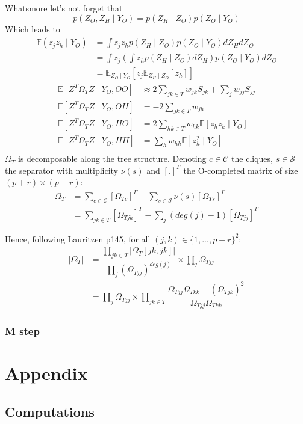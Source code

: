 \documentclass[11pt,a4paper]{article}
\newcommand{\Esp}{\mathds{E}}
\begin{document}
 Whatsmore let's not forget that
 $$ p(Z_O,Z_H \mid Y_O) = p(Z_H\mid Z_O) p(Z_O\mid Y_O)$$
 Which leads to 
 \begin{align*}
 \Esp(z_jz_h \mid Y_O)& = \int z_jz_hp(Z_H\mid Z_O)p(Z_O\mid Y_O) dZ_HdZ_O\\
 &=\int z_j\left(\int z_h p(Z_H\mid Z_O) dZ_H\right) p(Z_O\mid Y_O) dZ_O \\
 &=\Esp_{Z_O\mid Y_O}\left[z_j \Esp_{Z_H\mid Z_O}[z_h]\right]
 \end{align*}
  \begin{align*}
\Esp[Z^T \Omega_T Z \mid Y_O, OO] & \approx 2\sum_{jk \in T} w_{jk} S_{jk} + \sum_j w_{jj}S_{jj}\\
\Esp[Z^T \Omega_T Z \mid Y_O, OH] & = -2\sum_{jk \in T} w_{jh}  \\
\Esp[Z^T \Omega_T Z \mid Y_O, HO] &=  2\sum_{hk \in T} w_{hk}  \Esp[z_hz_k \mid Y_O]\\
\Esp[Z^T \Omega_T Z \mid Y_O, HH] &= \sum_h w_{hh} \Esp[z_h^2 \mid Y_O]\\
\end{align*} 
$\Omega_T$ is decomposable along the tree structure. Denoting $c\in\mathcal{C}$ the cliques, $s\in \mathcal{S}$ the separator with multiplicity $\nu(s)$ and $[.]^\Gamma$ the O-completed matrix of size $(p+r)\times(p+r)$:
\begin{align*}
\Omega_T &= \sum_{c\in \mathcal{C}} [\Omega_{Tc}]^\Gamma - \sum_{s \in\mathcal{S}} \nu(s)[\Omega_{Ts}]^\Gamma\\
&= \sum_{jk \in T} [\Omega_{Tjk}]^\Gamma - \sum_j (deg(j)-1)[\Omega_{Tjj}]^\Gamma
\end{align*}

Hence, following Lauritzen p145, for all $(j,k) \in \{1,...,p+r\}^2$:
\begin{align*}
|\Omega_T| &= \dfrac{\prod_{jk \in T} |\Omega_T[jk,jk]|}{\prod_j (\Omega_{Tjj})^{deg(j)}} \times \prod_j \Omega_{Tjj}\\
&=\prod_j \Omega_{Tjj} \times \prod_{jk \in T} \dfrac{\Omega_{Tjj}\Omega_{Tkk}-(\Omega_{Tjk})^2}{\Omega_{Tjj}\Omega_{Tkk}}
\end{align*}
\subsubsection{M step}

\section{Appendix}
\subsection{Computations}
\end{document}

